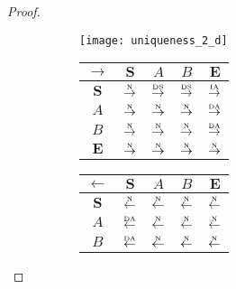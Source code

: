 \begin{proof}
\begin{figure}[htbp]
  \begin{subfigure}{1\textwidth}
    \vspace{1em}
    \centering
    \begin{minipage}[b]{1\textwidth}
      \centering
      \texttt{[image: uniqueness\_2\_d]}
    \end{minipage}
    \begin{minipage}[b]{0.3\textwidth}
      \vspace{1em}
      \centering
      \begin{tabular}{|c|c|c|c|c|} \hline
        $\rightarrow$ & $\bm{S}$ & $A$ & $B$ & $\bm{E}$\\ \hline
        $\bm{S}$ & $\overset{\text{\tiny{N}}}{\rightarrow}$ & $\overset{\text{\tiny{DS}}}{\rightarrow}$ & $\overset{\text{\tiny{DS}}}{\rightarrow}$ & $\overset{\text{\tiny{IA}}}{\rightarrow}$\\ \hline
        $A$ & $\overset{\text{\tiny{N}}}{\rightarrow}$ & $\overset{\text{\tiny{N}}}{\rightarrow}$ & $\overset{\text{\tiny{N}}}{\rightarrow}$ & $\overset{\text{\tiny{DA}}}{\rightarrow}$\\ \hline
        $B$ & $\overset{\text{\tiny{N}}}{\rightarrow}$ & $\overset{\text{\tiny{N}}}{\rightarrow}$ & $\overset{\text{\tiny{N}}}{\rightarrow}$ & $\overset{\text{\tiny{DA}}}{\rightarrow}$\\ \hline
        $\bm{E}$ & $\overset{\text{\tiny{N}}}{\rightarrow}$ & $\overset{\text{\tiny{N}}}{\rightarrow}$ & $\overset{\text{\tiny{N}}}{\rightarrow}$ & $\overset{\text{\tiny{N}}}{\rightarrow}$\\ \hline
      \end{tabular}
    \end{minipage}
    \begin{minipage}[b]{0.3\textwidth}
      \vspace{1em}
      \centering
      \begin{tabular}{|c|c|c|c|c|} \hline
        $\leftarrow$ & $\bm{S}$ & $A$ & $B$ & $\bm{E}$\\ \hline
        $\bm{S}$ & $\overset{\text{\tiny{N}}}{\leftarrow}$ & $\overset{\text{\tiny{N}}}{\leftarrow}$ & $\overset{\text{\tiny{N}}}{\leftarrow}$ & $\overset{\text{\tiny{N}}}{\leftarrow}$\\ \hline
        $A$ & $\overset{\text{\tiny{DA}}}{\leftarrow}$ & $\overset{\text{\tiny{N}}}{\leftarrow}$ & $\overset{\text{\tiny{N}}}{\leftarrow}$ & $\overset{\text{\tiny{N}}}{\leftarrow}$\\ \hline
        $B$ & $\overset{\text{\tiny{DA}}}{\leftarrow}$ & $\overset{\text{\tiny{N}}}{\leftarrow}$ & $\overset{\text{\tiny{N}}}{\leftarrow}$ & $\overset{\text{\tiny{N}}}{\leftarrow}$\\ \hline

\end{tabular}
\end{minipage}
\end{subfigure}
\end{figure}
\end{proof}
